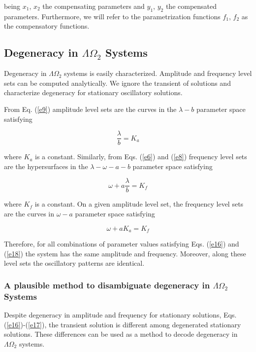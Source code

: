 being $x_{1}$, $x_{2}$ the compensating parameters and $y_{1}$, $y_{2}$ the compensated parameters. Furthermore, we will refer to the parametrization functions $f_{1}$, $f_{2}$ as the compensatory functions.

\subsection{Degeneracy in $\Lambda \Omega_{2}$ Systems}
Degeneracy in $\Lambda \Omega_{2}$ systems is easily characterized. Amplitude and frequency level sets can be computed analytically. We ignore the transient of solutions and characterize degeneracy for stationary oscillatory solutions.

From Eq. (\ref{e9}) amplitude level sets are the curves in the $\lambda-b$ parameter space satisfying

\begin{equation}
    \frac{\lambda}{b} = K_{a}
    \label{e16}
\end{equation}

where $K_{a}$ is a constant. Similarly, from Eqs. (\ref{e6}) and (\ref{e8}) frequency level sets are the hypersurfaces in the $\lambda-\omega-a-b$ parameter space satisfying 

\begin{equation}
    \omega+a\frac{\lambda}{b} = K_{f}
    \label{e17}
\end{equation}

where $K_{f}$ is a constant. On a given amplitude level set, the frequency level sets are the curves in $\omega-a$ parameter space satisfying

\begin{equation}
    \omega+aK_{a} = K_{f}
    \label{e18}
\end{equation}

Therefore, for all combinations of parameter values satisfying Eqs. (\ref{e16}) and (\ref{e18}) the system has the same amplitude and frequency. Moreover, along these level sets the oscillatory patterns are identical.

\subsubsection{A plausible method to disambiguate degeneracy in $\Lambda \Omega_{2}$ Systems}
Despite degeneracy in amplitude and frequency for stationary solutions, Eqs. (\ref{e16})-(\ref{e17}), the transient solution is different among degenerated stationary solutions. These differences can be used as a method to decode degeneracy in $\Lambda \Omega_{2}$ systems.

